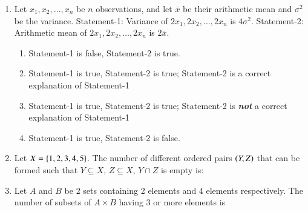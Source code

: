 \documentclass[journal,12pt,twocolumn]{IEEEtran}
\theoremstyle{remark}
\begin{document}
\begin{enumerate}
    \item Let $x_1, x_2, \dots, x_n$ be $n$ observations, and let $\overline{x}$ be their arithmetic mean and $\sigma^{2}$ be the variance.\newline
    Statement-1: Variance of $2x_1, 2x_2, \dots, 2x_n$ is $4\sigma^{2}$.\newline
    Statement-2: Arithmetic mean of $2x_1, 2x_2, \dots, 2x_n$ is $2\overline{x}$.
    
    \hfill{}
    \begin{enumerate}
        \item Statement-1 is false, Statement-2 is true.
        \item Statement-1 is true, Statement-2 is true; Statement-2 is a correct explanation of Statement-1
        \item Statement-1 is true, Statement-2 is true; Statement-2 is \textbf{\textit{not}} a correct explanation of Statement-1
        \item Statement-1 is true, Statement-2 is false.
    \end{enumerate}
    
    \item Let $X = \left\{1, 2, 3, 4, 5\right\}$. The number of different ordered pairs $\left(Y, Z\right)$ that can be formed such that $Y \subseteq X$, $Z \subseteq X$, $Y \cap Z$ is empty is:
    
    \hfill{}
    \begin{enumerate}
    \end{enumerate}
    
    \item Let $A$ and $B$ be 2 sets containing 2 elements and 4 elements respectively. The number of subsets of $A \times B$ having 3 or more elements is
    
    \hfill{}
    \begin{enumerate}
    \end{enumerate}
    

\end{enumerate}
\end{document}
